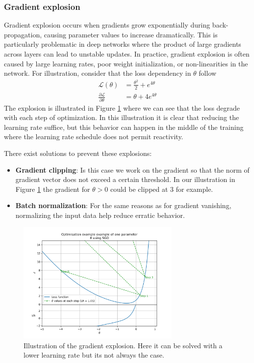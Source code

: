 \documentclass[../main.tex]{subfiles}
\begin{document}
\subsubsection{Gradient explosion}

Gradient explosion occurs when gradients grow exponentially during back-propagation, causing parameter values to increase dramatically. This is particularly problematic in deep networks where the product of large gradients across layers can lead to unstable updates. In practice, gradient explosion is often caused by large learning rates, poor weight initialization, or non-linearities in the network.
For illustration, consider that the loss dependency in $\theta$ follow
\begin{align*}
  \mathcal{L}(\theta) &= \frac{\theta^2}{2} + e^{4\theta} \\
  \frac{\partial \mathcal{L}}{\partial \theta} &= \theta + 4e^{4\theta}
\end{align*}
The explosion is illustrated in Figure \ref{fig:ml:explosion} where we can see that the loss degrade with each step of optimization. In this illustration it is clear that reducing the learning rate suffice, but this behavior can happen in the middle of the training where the learning rate schedule does not permit reactivity.

There exist solutions to prevent these explosions:
\begin{itemize}
  \item \textbf{Gradient clipping}: Is this case we work on the gradient so that the norm of gradient vector does not exceed a certain threshold. In our illustration in Figure \ref{fig:ml:explosion} the gradient for $\theta > 0$ could be clipped at 3 for example.
  \item \textbf{Batch normalization}: For the same reasons as for gradient vanishing, normalizing the input data help reduce erratic behavior.
\end{itemize}


\begin{figure}[ht]
  \centering
  \includegraphics[height=6cm]{scripts/plots/MSE_explosion_illustration.png}
  \caption{Illustration of the gradient explosion. Here it can be solved with a lower learning rate but its not always the case.}
  \label{fig:ml:explosion}
\end{figure}
\end{document}
